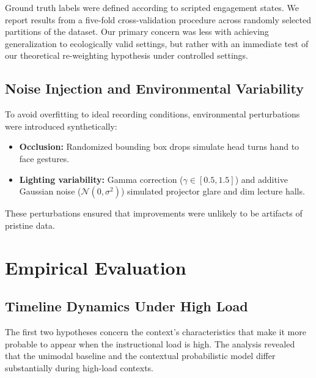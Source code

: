 \documentclass[conference]{IEEEtran}
\begin{document}
Ground truth labels were defined according to scripted engagement states. We report results from a five-fold cross-validation procedure across randomly selected partitions of the dataset. Our primary concern was less with achieving generalization to ecologically valid settings, but rather with an immediate test of our theoretical re-weighting hypothesis under controlled settings.

\subsection{Noise Injection and Environmental Variability}
To avoid overfitting to ideal recording conditions, environmental perturbations were introduced synthetically:
\begin{itemize}
    \item \textbf{Occlusion:} Randomized bounding box drops simulate head turns hand to face gestures.
    \item \textbf{Lighting variability:} Gamma correction ($\gamma \in [0.5, 1.5]$) and additive Gaussian noise ($\mathcal{N}(0, \sigma^2)$) simulated projector glare and dim lecture halls.
\end{itemize}

These perturbations ensured that improvements were unlikely to be artifacts of pristine data.

\section{Empirical Evaluation}

\subsection{Timeline Dynamics Under High Load}
The first two hypotheses concern the context’s characteristics that make it more probable to appear when the instructional load is high. The analysis revealed that the unimodal baseline and the contextual probabilistic model differ substantially during high-load contexts.
\end{document}
